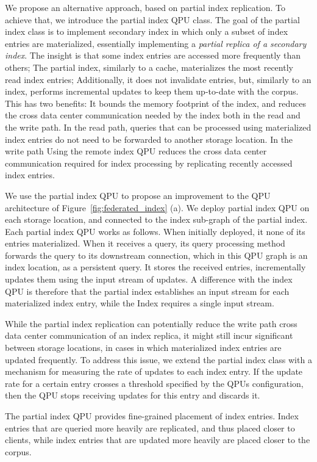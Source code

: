 We propose an alternative approach, based on partial index replication.
To achieve that, we introduce the partial index QPU class.
The goal of the partial index class is to implement secondary index in which only a subset of index entries are materialized,
essentially implementing a \textit{partial replica of a secondary index}.
The insight is that some index entries are accessed more frequently than others;
The partial index, similarly to a cache, materializes the most recently read index entries;
Additionally, it does not invalidate entries, but, similarly to an index, performs incremental updates to keep them up-to-date
with the corpus.
This has two benefits:
It bounds the memory footprint of the index, and reduces the cross data center communication needed by the index both in the read and the write path.
In the read path, queries that can be processed using materialized index entries do not need to be forwarded to
another storage location.
In the write path
Using the remote index QPU reduces the cross data center communication required for index processing by
replicating recently accessed index entries.

We use the partial index QPU to propose an improvement to the QPU architecture of Figure~\ref{fig:federated_index} (a).
We deploy partial index QPU on each storage location, and connected to the index sub-graph of the partial index.
Each partial index QPU works as follows.
When initially deployed, it none of its entries materialized.
When it receives a query, its query processing method forwards the query to its downstream connection,
which in this QPU graph is an index location, as a persistent query.
It stores the received entries, incrementally updates them using the input stream of updates.
A difference with the index QPU is therefore that the partial index establishes an input stream for each materialized
index entry, while the Index requires a single input stream.

While the partial index replication can potentially reduce the write path cross data center communication of an index replica,
it might still incur significant between storage locations,
in cases in which materialized index entries are updated frequently.
To address this issue,
we extend the partial index class with a mechanism for measuring the rate of updates to each index entry.
If the update rate for a certain entry crosses a threshold specified by the QPUs configuration,
then the QPU stops receiving updates for this entry and discards it.

The partial index QPU provides fine-grained placement of index entries.
Index entries that are queried more heavily are replicated, and thus placed closer to clients,
while index entries that are updated more heavily are placed closer to the corpus.

